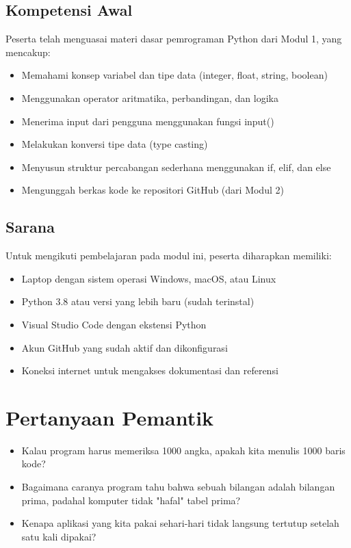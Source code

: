 \documentclass[12pt,a4paper]{article}
\begin{document}
\subsection{Kompetensi Awal}

Peserta telah menguasai materi dasar pemrograman Python dari Modul 1, yang mencakup:

\begin{itemize}
    \item Memahami konsep variabel dan tipe data (integer, float, string, boolean)
    \item Menggunakan operator aritmatika, perbandingan, dan logika
    \item Menerima input dari pengguna menggunakan fungsi input()
    \item Melakukan konversi tipe data (type casting)
    \item Menyusun struktur percabangan sederhana menggunakan if, elif, dan else
    \item Mengunggah berkas kode ke repositori GitHub (dari Modul 2)
\end{itemize}

\subsection{Sarana}

Untuk mengikuti pembelajaran pada modul ini, peserta diharapkan memiliki:

\begin{itemize}
    \item Laptop dengan sistem operasi Windows, macOS, atau Linux
    \item Python 3.8 atau versi yang lebih baru (sudah terinstal)
    \item Visual Studio Code dengan ekstensi Python
    \item Akun GitHub yang sudah aktif dan dikonfigurasi
    \item Koneksi internet untuk mengakses dokumentasi dan referensi
\end{itemize}

\section{Pertanyaan Pemantik}

\begin{itemize}
    \item Kalau program harus memeriksa 1000 angka, apakah kita menulis 1000 baris kode?
    \item Bagaimana caranya program tahu bahwa sebuah bilangan adalah bilangan prima, padahal komputer tidak "hafal" tabel prima?
    \item Kenapa aplikasi yang kita pakai sehari-hari tidak langsung tertutup setelah satu kali dipakai?
\end{itemize}
\end{document}
